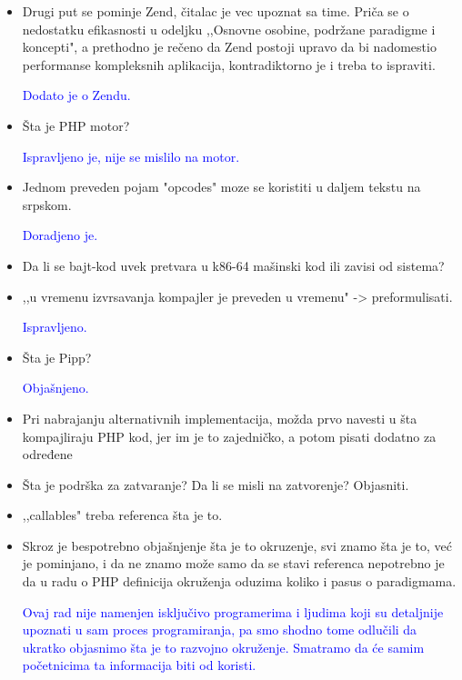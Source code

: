 \documentclass[a4paper]{report}
\newcommand{\odgovor}[1]{\textcolor{blue}{#1}}
\begin{document}
\begin{itemize}
\item Drugi put se pominje Zend, čitalac je vec upoznat sa time. Priča se o nedostatku efikasnosti u odeljku ,,Osnovne osobine, podržane paradigme i koncepti", a prethodno je rečeno da Zend postoji upravo da bi nadomestio performanse kompleksnih aplikacija, kontradiktorno je i treba to ispraviti.

\odgovor{Dodato je o Zendu.}

\item Šta je PHP motor?

\odgovor{Ispravljeno je, nije se mislilo na motor.}

\item Jednom preveden pojam "opcodes" moze se koristiti u daljem tekstu na srpskom.

\odgovor{Doradjeno je.}

\item Da li se bajt-kod uvek pretvara u k86-64 mašinski kod ili zavisi od sistema?

\odgovor{}

\item ,,u vremenu izvrsavanja kompajler je preveden u vremenu" -> preformulisati.

\odgovor{Ispravljeno.}

\item Šta je Pipp?

\odgovor{Objašnjeno.}

\item Pri nabrajanju alternativnih implementacija, možda prvo navesti u šta kompajliraju PHP kod, jer im je to zajedničko, a potom pisati dodatno za određene

\odgovor{}

\item Šta je podrška za zatvaranje? Da li se misli na zatvorenje? Objasniti.

\odgovor{}

\item ,,callables" treba referenca šta je to.

\odgovor{}

\item Skroz je bespotrebno objašnjenje šta je to okruzenje, svi znamo šta je to, već je pominjano, i da ne znamo može samo da se stavi referenca nepotrebno je da u radu o PHP definicija okruženja oduzima koliko i pasus o paradigmama.

\odgovor{Ovaj rad nije namenjen isključivo programerima i ljudima koji su detaljnije upoznati u sam proces programiranja, pa smo shodno tome odlučili da ukratko objasnimo šta je to razvojno okruženje. Smatramo da će samim početnicima ta informacija biti od koristi.}


\end{itemize}
\end{document}
